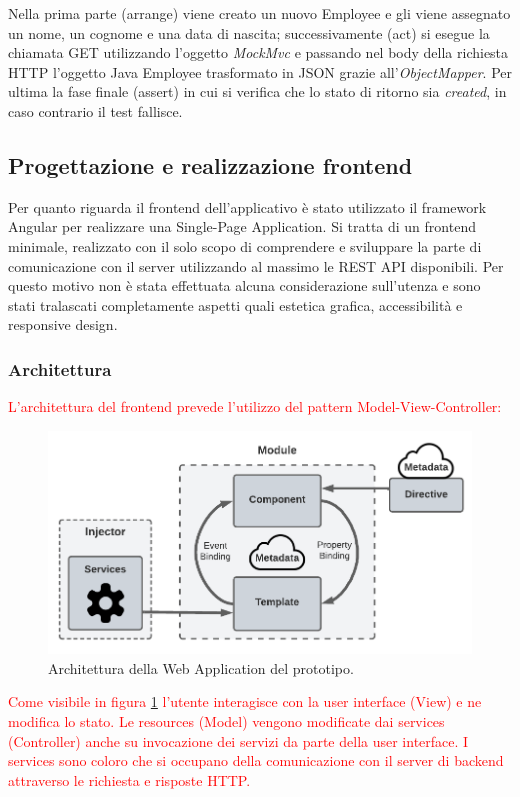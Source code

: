 \FloatBarrier
Nella prima parte (arrange) viene creato un nuovo Employee e gli viene assegnato un nome, un cognome e una data di nascita; successivamente (act) si esegue la chiamata GET utilizzando l'oggetto \textit{MockMvc} e passando nel body della richiesta HTTP l'oggetto Java Employee trasformato in JSON grazie all'\textit{ObjectMapper}. Per ultima la fase finale (assert) in cui si verifica che lo stato di ritorno sia \textit{created}, in caso contrario il test fallisce.
\subsection{Progettazione e realizzazione frontend}
Per quanto riguarda il frontend dell'applicativo è stato utilizzato il framework Angular per realizzare una Single-Page Application. Si tratta di un frontend minimale, realizzato con il solo scopo di comprendere e sviluppare la parte di comunicazione con il server utilizzando al massimo le REST API disponibili. Per questo motivo non è stata effettuata alcuna considerazione sull'utenza e sono stati tralascati completamente aspetti quali estetica grafica, accessibilità e responsive design.\\
\subsubsection*{Architettura}
\textcolor{red}{L'architettura del frontend prevede l'utilizzo del pattern Model-View-Controller:}
\FloatBarrier
\begin{figure}[!ht]
\centering
\includegraphics[width=1\linewidth]{immagini/angularArchitecture.pdf}
\caption{Architettura della Web Application del prototipo.}
\label{angular-architecture}
\end{figure}
\FloatBarrier
\textcolor{red}{Come visibile in figura \ref{angular-architecture} l'utente interagisce con la user interface (View) e ne modifica lo stato. Le resources (Model) vengono modificate dai services (Controller) anche su invocazione dei servizi da parte della user interface. I services sono coloro che si occupano della comunicazione con il server di backend attraverso le richiesta e risposte HTTP.}
